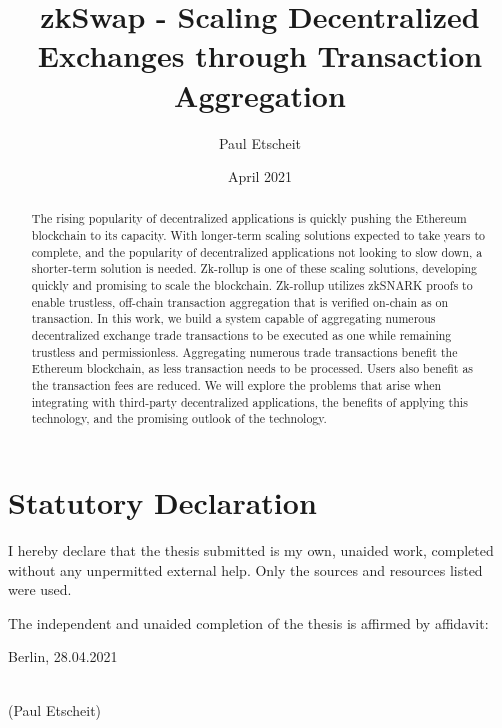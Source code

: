 \documentclass[11pt,a4paper,final]{article}
\title{zkSwap - Scaling Decentralized Exchanges through Transaction Aggregation}
\author{Paul Etscheit}
\date{April 2021}
\begin{document}
    \begin{titlepage}
        \maketitle
    \end{titlepage}
    \section{Statutory Declaration}
    I hereby declare that the thesis submitted is my own, unaided work, completed without any unpermitted external help. Only the sources and resources listed were used. 
    
    The independent and unaided completion of the thesis is affirmed by affidavit:
    
    \vspace{3cm}
    
    \noindent Berlin, 28.04.2021
    \vspace{1.5cm}
     
    \noindent\dotfill\\
    \noindent(Paul Etscheit)
    \clearpage

    

    \begin{abstract}
        The rising popularity of decentralized applications is quickly pushing the Ethereum blockchain to its capacity. With longer-term scaling solutions expected to take years to complete, and the popularity of decentralized applications not looking to slow down, a shorter-term solution is needed. Zk-rollup is one of these scaling solutions, developing quickly and promising to scale the blockchain. Zk-rollup utilizes zkSNARK proofs to enable trustless, off-chain transaction aggregation that is verified on-chain as on transaction. In this work, we build a system capable of aggregating numerous decentralized exchange trade transactions to be executed as one while remaining trustless and permissionless. Aggregating numerous trade transactions benefit the Ethereum blockchain, as less transaction needs to be processed. Users also benefit as the transaction fees are reduced. We will explore the problems that arise when integrating with third-party decentralized applications, the benefits of applying this technology, and the promising outlook of the technology. 
    \end{abstract}
\end{document}
